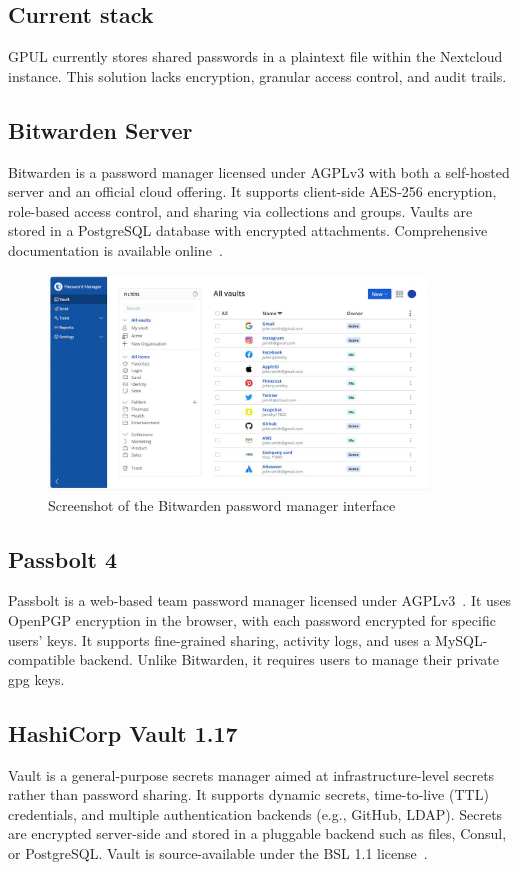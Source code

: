 \subsection*{Current stack}
GPUL currently stores shared passwords in a plaintext file within the Nextcloud instance. This solution lacks encryption, granular access control, and audit trails.

\subsection*{Bitwarden Server}
Bitwarden is a password manager licensed under AGPLv3 with both a self-hosted server and an official cloud offering. It supports client-side AES-256 encryption, role-based access control, and sharing via collections and groups. Vaults are stored in a PostgreSQL database with encrypted attachments. Comprehensive documentation is available online~\cite{bitwarden-docs}.

\begin{figure}[H]
  \centering
  \includegraphics[width=0.9\textwidth]{imaxes/bitwarden-ui.png}
  \caption{Screenshot of the Bitwarden password manager interface}
  \label{fig:bitwarden-ui}
\end{figure}

\subsection*{Passbolt 4}
Passbolt is a web-based team password manager licensed under AGPLv3~\cite{passbolt-security}. It uses OpenPGP encryption in the browser, with each password encrypted for specific users' keys. It supports fine-grained sharing, activity logs, and uses a MySQL-compatible backend. Unlike Bitwarden, it requires users to manage their private \gls{gpg} keys.

\subsection*{HashiCorp Vault 1.17}
Vault is a general-purpose secrets manager aimed at infrastructure-level secrets rather than password sharing. It supports dynamic secrets, time-to-live (TTL) credentials, and multiple authentication backends (e.g., GitHub, LDAP). Secrets are encrypted server-side and stored in a pluggable backend such as files, Consul, or PostgreSQL. Vault is source-available under the BSL 1.1 license~\cite{vault-bsl}.

